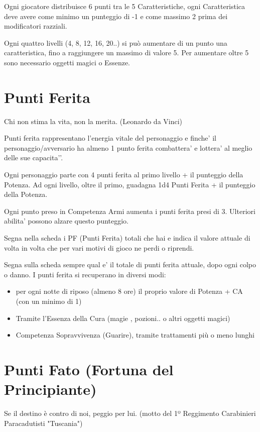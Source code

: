 \documentclass[a4paper,11pt,twoside,openany]{book}
\begin{document}
Ogni giocatore distribuisce 6 punti tra le 5 Caratteristiche, ogni Caratteristica deve avere come minimo un punteggio di -1 e come massimo 2 prima dei modificatori razziali.

Ogni quattro livelli (4, 8, 12, 16, 20..) si può aumentare di un punto una caratteristica, fino a raggiungere un massimo di valore 5. Per aumentare oltre 5 sono necessario oggetti magici o Essenze.


\section{Punti Ferita}

\begin{tcolorbox}[enhanced,arc=5pt,boxrule=0.3pt]{Chi non stima la vita, non la merita. (Leonardo da Vinci)}\end{tcolorbox}\medskip


Punti ferita rappresentano l’energia vitale del personaggio e finche’ il personaggio/avversario ha almeno 1 punto ferita combattera’ e lottera’ al meglio delle sue capacita'’.

Ogni personaggio parte con 4 punti ferita al primo livello + il punteggio della Potenza.
Ad ogni livello, oltre il primo, guadagna 1d4 Punti Ferita + il punteggio della Potenza.

Ogni punto preso in Competenza Armi aumenta i punti ferita presi di 3. Ulteriori abilita’ possono alzare questo punteggio.

Segna nella scheda i PF (Punti Ferita) totali che hai e indica il valore attuale di volta in volta che per vari motivi di gioco ne perdi o riprendi.

Segna sulla scheda sempre qual e’ il totale di punti ferita attuale, dopo ogni colpo o danno.
I punti ferita si recuperano in diversi modi:

\begin{itemize}
	\item
	      per ogni notte di riposo (almeno 8 ore) il proprio valore di Potenza + CA (con un minimo di 1)
	\item
	      Tramite l'Essenza della Cura (magie , pozioni.. o altri oggetti magici)
	\item
	      Competenza Sopravvivenza (Guarire), tramite trattamenti più o meno lunghi
\end{itemize}

\section{Punti Fato (Fortuna del Principiante)}
\begin{tcolorbox}[enhanced,arc=5pt,boxrule=0.3pt]{Se il destino è contro di noi, peggio per lui. (motto del 1º Reggimento Carabinieri Paracadutisti "Tuscania")}\end{tcolorbox}\medskip
\end{document}
